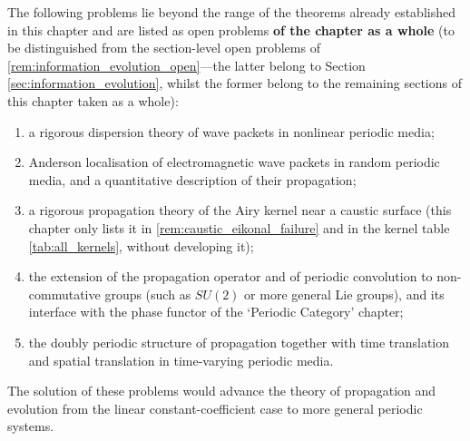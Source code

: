 \begin{remark}\label{rem:propagation_open}
The following problems lie beyond the range of the theorems already established in this chapter and are listed as open problems \textbf{of the chapter as a whole} (to be distinguished from the section-level open problems of \cref{rem:information_evolution_open}---the latter belong to Section \ref{sec:information_evolution}, whilst the former belong to the remaining sections of this chapter taken as a whole):
\begin{enumerate}[label=(\roman*)]
    \item a rigorous dispersion theory of wave packets in nonlinear periodic media;
    \item Anderson localisation of electromagnetic wave packets in random periodic media, and a quantitative description of their propagation;
    \item a rigorous propagation theory of the Airy kernel near a caustic surface (this chapter only lists it in \cref{rem:caustic_eikonal_failure} and in the kernel table \ref{tab:all_kernels}, without developing it);
    \item the extension of the propagation operator and of periodic convolution to non-commutative groups (such as $SU(2)$ or more general Lie groups), and its interface with the phase functor of the `Periodic Category' chapter;
    \item the doubly periodic structure of propagation together with time translation and spatial translation in time-varying periodic media.
\end{enumerate}
The solution of these problems would advance the theory of propagation and evolution from the linear constant-coefficient case to more general periodic systems.
\end{remark}

